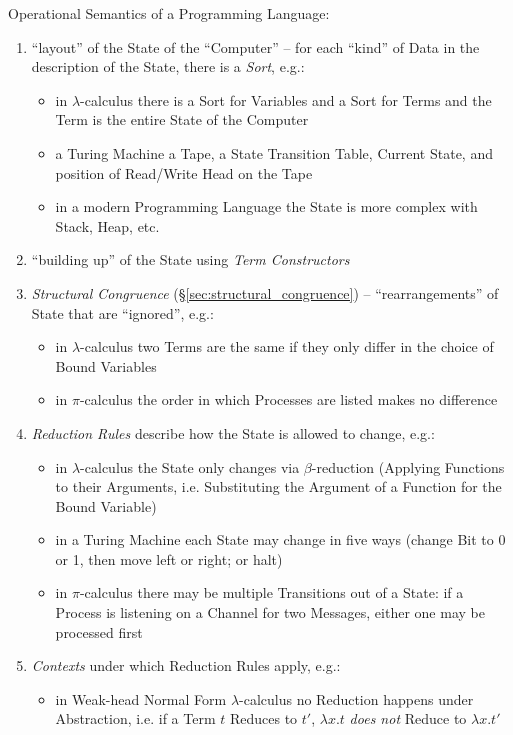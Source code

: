 Operational Semantics of a Programming Language:
\begin{enumerate}
  \item ``layout'' of the State of the ``Computer'' -- for each
    ``kind'' of Data in the description of the State, there is a
    \emph{Sort}, e.g.:
    \begin{itemize}
      \item in $\lambda$-calculus there is a Sort for Variables and a
        Sort for Terms and the Term is the entire State of the
        Computer
      \item a Turing Machine a Tape, a State Transition Table, Current
        State, and position of Read/Write Head on the Tape
      \item in a modern Programming Language the State is more complex
        with Stack, Heap, etc.
    \end{itemize}
  \item ``building up'' of the State using \emph{Term Constructors}
  \item \emph{Structural Congruence} (\S\ref{sec:structural_congruence}) --
    ``rearrangements'' of State that are ``ignored'', e.g.:
    \begin{itemize}
      \item in $\lambda$-calculus two Terms are the same if they only
        differ in the choice of Bound Variables
      \item in $\pi$-calculus the order in which Processes are listed
        makes no difference
    \end{itemize}
  \item \emph{Reduction Rules} describe how the State is allowed to
    change, e.g.:
    \begin{itemize}
      \item in $\lambda$-calculus the State only changes via
        $\beta$-reduction (Applying Functions to their Arguments, i.e.
        Substituting the Argument of a Function for the Bound Variable)
      \item in a Turing Machine each State may change in five ways
        (change Bit to 0 or 1, then move left or right; or halt)
      \item in $\pi$-calculus there may be multiple Transitions out of a
        State: if a Process is listening on a Channel for two Messages,
        either one may be processed first
    \end{itemize}
  \item \emph{Contexts} under which Reduction Rules apply, e.g.:
    \begin{itemize}
      \item in Weak-head Normal Form $\lambda$-calculus no Reduction
        happens under Abstraction, i.e. if a Term $t$ Reduces to $t'$,
        $\lambda x.t$ \emph{does not} Reduce to $\lambda x.t'$
    \end{itemize}
\end{enumerate}

